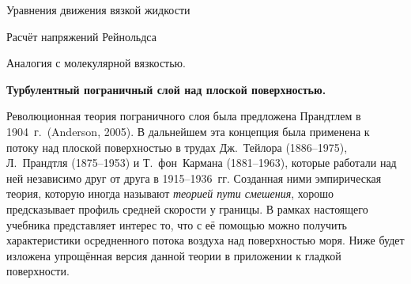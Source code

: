 \begin{chapter}{Уравнения движения вязкой жидкости}
\begin{section}{Расчёт напряжений Рейнольдса}
\begin{paragraph}{Аналогия с молекулярной вязкостью.}
\begin{center}
\textbf{Турбулентный пограничный слой над плоской поверхностью.}
\end{center}
%
Революционная теория пограничного слоя была предложена Прандтлем 
в 1904~г.\ (Anderson, 2005). В дальнейшем эта концепция была применена к
потоку над плоской поверхностью в трудах Дж.~Тейлора (1886--1975),
Л.~Прандтля (1875--1953) и Т.~фон~Кармана (1881--1963), которые работали над
ней независимо друг от друга в 1915--1936~гг. Созданная ними эмпирическая
теория, которую иногда называют 
\emph{теорией пути смешения},
хорошо предсказывает профиль средней скорости у границы. 
В рамках настоящего учебника представляет интерес то, что с её помощью можно
получить характеристики осредненного потока воздуха над поверхностью моря.
Ниже будет изложена упрощённая версия данной теории в приложении к гладкой
поверхности.
%


\end{paragraph}
\end{section}
\end{chapter}
